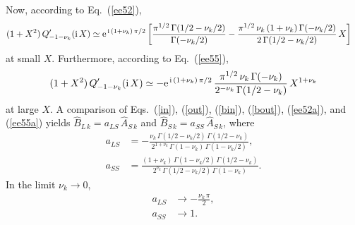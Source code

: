 \documentclass[12pt,prb,aps]{revtex4-1}
\begin{document}
Now, according to Eq.~(\ref{ee52}), 
\begin{align}\label{ee52a}
(1+X^2)\,Q_{-1-\nu_k}'({\rm i}\,X)&\simeq {\rm e}^{\,{\rm i}\,(1+\nu_k)\,\pi/2}\left[\frac{\pi^{1/2}\,\Gamma(1/2-\nu_k/2)}{\Gamma(-\nu_k/2)}-
\frac{\pi^{1/2}\,\nu_k\,(1+\nu_k)\,\Gamma(-\nu_k/2)}{2\,\Gamma(1/2-\nu_k/2)}\,X\right]
\end{align}
at small $X$. 
Furthermore, according to Eq.~(\ref{ee55}), 
\begin{align}\label{ee55a}
(1+X^2)\,Q_{-1-\nu_k}'({\rm i}\,X) \simeq- {\rm e}^{\,{\rm i}\,(1+\nu_k)\,\pi/2}\,\frac{\pi^{1/2}\,\nu_k\,{\Gamma}(-\nu_k)}{2^{-\nu_k}\,\Gamma(1/2-\nu_k)}\,X^{1+\nu_k}
\end{align}
at large $X$. 
A comparison of Eqs.~(\ref{in}), (\ref{out}), (\ref{bin}), (\ref{bout}), (\ref{ee52a}), and (\ref{ee55a}) yields
$\hat{B}_{L\,k} = a_{LS}\,\hat{A}_{S\,k}$ and 
$\hat{B}_{S\,k}= a_{SS}\,\hat{A}_{S\,k}$, 
where
\begin{align}
a_{LS} &= -\frac{\nu_k\,\Gamma(1/2-\nu_k/2)\,\Gamma(1/2-\nu_k)}{2^{1+\nu_k}\,\Gamma(1-\nu_k)\,\Gamma(1-\nu_k/2)},\\[0.5ex]
a_{SS}&= \frac{(1+\nu_k)\,\Gamma(1-\nu_k/2)\,\Gamma(1/2-\nu_k)}{2^{\nu_k}\,\Gamma(1/2-\nu_k/2)\,\Gamma(1-\nu_k)}.
\end{align}
In the limit $\nu_k\rightarrow 0$,
\begin{align}\label{ee38x}
a_{LS}&\rightarrow -\frac{\nu_k\,\pi}{2},\\[0.5ex]
a_{SS} &\rightarrow 1.\label{ee39}
\end{align}
\end{document}
